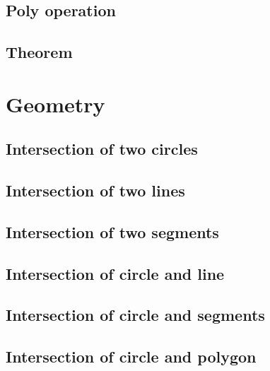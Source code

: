 \documentclass[a4paper,10pt,twocolumn,oneside]{article}
\begin{document}
\subsection{Poly operation}


\subsection{Theorem}



\section{Geometry}

\subsection{Intersection of two circles}


\subsection{Intersection of two lines}


\subsection{Intersection of two segments}


\subsection{Intersection of circle and line}


\subsection{Intersection of circle and segments}


\subsection{Intersection of circle and polygon}

\end{document}
